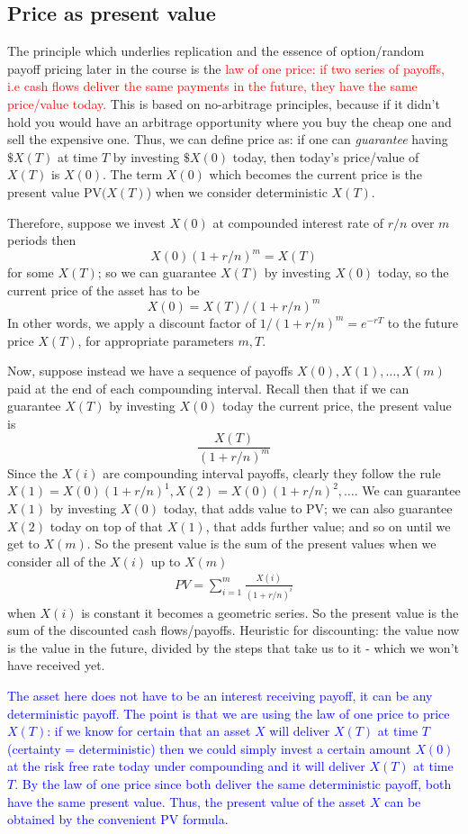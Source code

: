 \documentclass[9pt]{extarticle}
\begin{document}
\subsection{Price as present value}

The principle which underlies replication and the essence of option/random 
payoff pricing later in the course is the \textcolor{red}{law of one price: if two 
series of payoffs, i.e cash flows deliver the same payments in the future, they have the same price/value 
today.} This is based on no-arbitrage principles, because if it didn't hold you 
would have an arbitrage opportunity where you buy the cheap one and sell 
the expensive one.
Thus, we can define price as: if one can \textit{guarantee} having $\$X(T)$ at time $T$ by 
investing $\$X(0)$ today, then today's price/value of $X(T)$ is $X(0)$. The term 
$X(0)$ which becomes the current price is the present value PV$(X(T)$) when we consider 
deterministic $X(T)$.

Therefore, suppose we invest $X(0)$ at compounded interest rate of $r/n$ over $m$ periods then 
$$X(0)(1+r/n)^m = X(T) $$
for some $X(T)$; so we can guarantee $X(T)$ by investing $X(0)$ today, 
so the current price of the asset has to be 
$$ X(0) = X(T)/(1+r/n)^m$$
In other words, we apply a discount factor of $1/(1+r/n)^m = e^{-rT}$ to the 
future price $X(T)$, for appropriate parameters $m,T$.

Now, suppose instead we have a sequence of payoffs 
$X(0),X(1),\ldots,X(m)$ paid at the end 
of each compounding interval. Recall then that if we can guarantee 
$X(T)$ by investing $X(0)$ today the current price, the present value is 
$$\frac{X(T)}{(1+r/n)^m} $$
Since the $X(i)$ are compounding interval payoffs, clearly they follow the rule 
$X(1)=X(0)(1+r/n)^1, X(2)=X(0)(1+r/n)^2,\ldots$. We can guarantee $X(1)$ 
by investing $X(0)$ today, that adds value to PV; we can also guarantee 
$X(2)$ today on top of that $X(1)$, that adds further value; and so on until we get to $X(m)$. So the present 
value is the sum of the present values when we 
consider all of the $X(i)$ up to $X(m)$
\begin{align}
  PV = \sum_{i=1}^m \frac{X(i)}{(1+r/n)^i}  
\end{align}
when $X(i)$ is constant it becomes a geometric series. So the present value is the sum of 
the discounted cash flows/payoffs. Heuristic for discounting: the value now is the 
value in the future, divided by the steps that take us to it - which we won't have received yet.

\textcolor{blue}{The asset here does not have to be an interest receiving payoff, it can 
be any deterministic payoff. The 
point is that we are using the law of one price to 
price $X(T)$: if we know for certain that an asset $X$ will deliver 
$X(T)$ at time $T$ (certainty = deterministic) then we could simply invest 
a certain amount 
$X(0)$ at the risk free rate today under compounding and it 
will deliver $X(T)$ at time $T$. By the law of one price since both 
deliver the same deterministic payoff, both have the same present value. Thus, 
the present value of the asset $X$ can be obtained by the convenient 
PV formula.}
\end{document}
